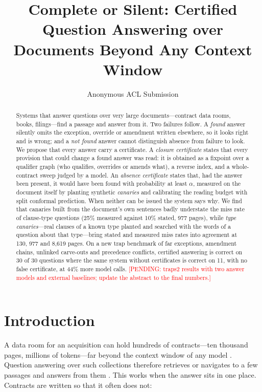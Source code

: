 \documentclass[11pt]{article}
\title{Complete or Silent: Certified Question Answering over\\ Documents Beyond Any Context Window}
\author{Anonymous ACL Submission}
\newcommand{\pending}[1]{\textcolor{red}{[PENDING: #1]}}   %
\begin{document}
\maketitle

\begin{abstract}
Systems that answer questions over very large documents---contract data rooms, books, filings---find a passage and answer from it. Two failures follow. A \emph{found} answer silently omits the exception, override or amendment written elsewhere, so it looks right and is wrong; and a \emph{not found} answer cannot distinguish absence from failure to look. We propose that every answer carry a certificate. A \emph{closure certificate} states that every provision that could change a found answer was read: it is obtained as a fixpoint over a qualifier graph (who qualifies, overrides or amends what), a reverse index, and a whole-contract sweep judged by a model. An \emph{absence certificate} states that, had the answer been present, it would have been found with probability at least $\alpha$, measured on the document itself by planting synthetic \emph{canaries} and calibrating the reading budget with split conformal prediction. When neither can be issued the system says why. We find that canaries built from the document's own sentences badly understate the miss rate of clause-type questions (25\% measured against 10\% stated, 977 pages), while \emph{type canaries}---real clauses of a known type planted and searched with the words of a question about that type---bring stated and measured miss rates into agreement at 130, 977 and 8,619 pages. On a new trap benchmark of far exceptions, amendment chains, unlinked carve-outs and precedence conflicts, certified answering is correct on 30 of 30 questions where the same system without certificates is correct on 11, with no false certificate, at 44\% more model calls. \pending{traps2 results with two answer models and external baselines; update the abstract to the final numbers.}
\end{abstract}

\section{Introduction}

A data room for an acquisition can hold hundreds of contracts---ten thousand pages, millions of tokens---far beyond the context window of any model \citep{liu2024lost,hsieh2024ruler}. Question answering over such collections therefore retrieves or navigates to a few passages and answers from them \citep{lewis2020rag,sarthi2024raptor,chen2023memwalker,zhang2024chainofagents}. This works when the answer sits in one place. Contracts are written so that it often does not:
\end{document}
